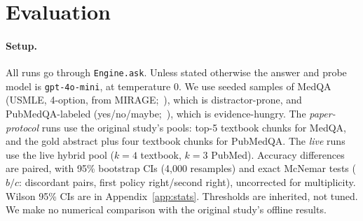 \documentclass[11pt]{article}
\begin{document}
\section{Evaluation}
\label{sec:eval}
\paragraph{Setup.} All runs go through \texttt{Engine.ask}. Unless stated
otherwise the answer and probe model is \texttt{gpt-4o-mini}, at temperature 0.
We use seeded samples of MedQA~\citep{medqa} (USMLE, 4-option, from
MIRAGE;~\citealp{medrag}), which is distractor-prone, and PubMedQA-labeled
(yes/no/maybe;~\citealp{pubmedqa}), which is evidence-hungry. The
\emph{paper-protocol} runs use the original study's pools: top-5 textbook chunks
for MedQA, and the gold abstract plus four textbook chunks for PubMedQA. The
\emph{live} runs use the live hybrid pool ($k{=}4$ textbook, $k{=}3$ PubMed).
Accuracy differences are paired, with 95\% bootstrap CIs (4{,}000 resamples)
and exact McNemar tests ($b/c$: discordant pairs, first policy right/second
right), uncorrected for multiplicity. Wilson 95\% CIs are in Appendix~\ref{app:stats}.
Thresholds are inherited, not tuned. We make no numerical comparison with the
original study's offline results.
\end{document}
